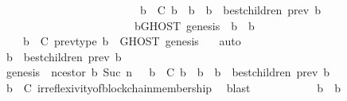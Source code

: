 \begin{isabellebody}
\ \ \ \ \ \ \ \ \ \ \ \ \ \ \ \ \ \ \ \ \ \ \ \ {\isacharparenleft}{\isasymforall}\ b{\isacharprime}\ {\isasymin}\ C{\isachardot}\ b{\isacharprime}\ {\isasymdownharpoonright}\ b\ {\isasymlongrightarrow}\ b{\isacharprime}\ {\isasymin}\ best{\isacharunderscore}children\ {\isacharparenleft}prev\ b{\isacharprime}{\isacharcomma}\ {\isasymsigma}{\isacharparenright}{\isacharparenright}\ {\isasymlongrightarrow}\isanewline
\ \ \ \ \ \ \ \ \ \ \ \ \ \ \ \ \ \ \ \ \ \ \ \ {\isacharparenleft}{\isasymforall}b{\isacharprime}{\isacharprime}{\isasymin}GHOST\ {\isacharparenleft}{\isacharbraceleft}genesis{\isacharbraceright}{\isacharcomma}\ {\isasymsigma}{\isacharparenright}{\isachardot}\ b\ {\isasymdownharpoonright}\ b{\isacharprime}{\isacharprime}{\isacharparenright}{\isacartoucheclose}\isanewline
\ \ \ \ \ \ \ \ \ \ \isamarkupfalse%
\ {\isacartoucheopen}{\isasymsigma}\ {\isasymin}\ {\isasymSigma}{\isacartoucheclose}\ {\isacartoucheopen}b\ {\isasymin}\ C{\isacartoucheclose}\ prev{\isacharunderscore}type\ {\isacartoucheopen}b{\isacharprime}{\isacharprime}\ {\isasymin}\ GHOST\ {\isacharparenleft}{\isacharbraceleft}genesis{\isacharbraceright}{\isacharcomma}\ {\isasymsigma}{\isacharparenright}{\isacartoucheclose}\ \isamarkupfalse%
\ auto\ \isanewline
\ \ \ \ \ \ \ \ \isamarkupfalse%
\ {\isachardoublequoteopen}b\ {\isasymin}\ best{\isacharunderscore}children\ {\isacharparenleft}prev\ b{\isacharcomma}\ {\isasymsigma}{\isacharparenright}{\isachardoublequoteclose}\isanewline
\ \ \ \ \ \ \ \ \ \ \isamarkupfalse%
\ {\isacartoucheopen}genesis\ {\isacharequal}\ n{\isacharunderscore}cestor\ {\isacharparenleft}b{\isacharcomma}\ Suc\ n{\isacharparenright}\ {\isasymand}\ {\isacharparenleft}{\isasymforall}\ b{\isacharprime}\ {\isasymin}\ C{\isachardot}\ b{\isacharprime}\ {\isasymdownharpoonright}\ b\ {\isasymlongrightarrow}\ b{\isacharprime}\ {\isasymin}\ best{\isacharunderscore}children\ {\isacharparenleft}prev\ b{\isacharprime}{\isacharcomma}\ {\isasymsigma}{\isacharparenright}{\isacharparenright}{\isacartoucheclose}\isanewline
\ \ \ \ \ \ \ \ \ \ \isamarkupfalse%
\ {\isacartoucheopen}b\ {\isasymin}\ C{\isacartoucheclose}\ irreflexivity{\isacharunderscore}of{\isacharunderscore}blockchain{\isacharunderscore}membership\ \isamarkupfalse%
\ blast\isanewline
\ \ \ \ \ \ \ \ \isamarkupfalse%
\ \isamarkupfalse%
\ {\isachardoublequoteopen}b\ {\isasymdownharpoonright}\ b{\isacharprime}{\isacharprime}{\isachardoublequoteclose}\ \ \ \isanewline
\ \ \ \ \ \ \ \ \ \ \isamarkupfalse%

\end{isabellebody}
